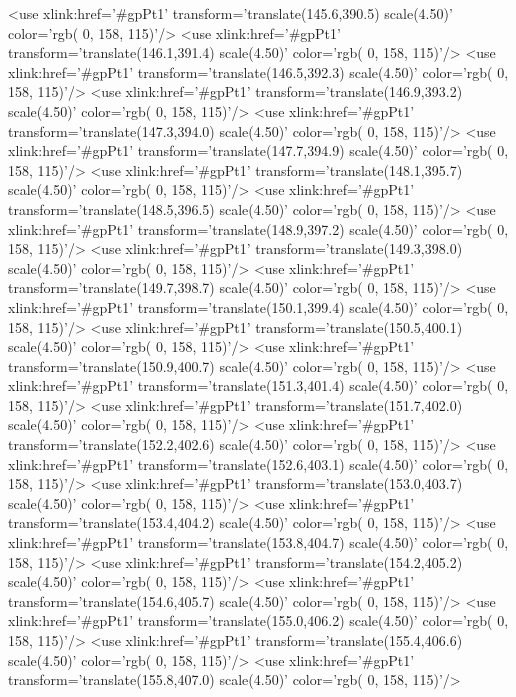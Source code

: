 	<use xlink:href='#gpPt1' transform='translate(145.6,390.5) scale(4.50)' color='rgb(  0, 158, 115)'/>
	<use xlink:href='#gpPt1' transform='translate(146.1,391.4) scale(4.50)' color='rgb(  0, 158, 115)'/>
	<use xlink:href='#gpPt1' transform='translate(146.5,392.3) scale(4.50)' color='rgb(  0, 158, 115)'/>
	<use xlink:href='#gpPt1' transform='translate(146.9,393.2) scale(4.50)' color='rgb(  0, 158, 115)'/>
	<use xlink:href='#gpPt1' transform='translate(147.3,394.0) scale(4.50)' color='rgb(  0, 158, 115)'/>
	<use xlink:href='#gpPt1' transform='translate(147.7,394.9) scale(4.50)' color='rgb(  0, 158, 115)'/>
	<use xlink:href='#gpPt1' transform='translate(148.1,395.7) scale(4.50)' color='rgb(  0, 158, 115)'/>
	<use xlink:href='#gpPt1' transform='translate(148.5,396.5) scale(4.50)' color='rgb(  0, 158, 115)'/>
	<use xlink:href='#gpPt1' transform='translate(148.9,397.2) scale(4.50)' color='rgb(  0, 158, 115)'/>
	<use xlink:href='#gpPt1' transform='translate(149.3,398.0) scale(4.50)' color='rgb(  0, 158, 115)'/>
	<use xlink:href='#gpPt1' transform='translate(149.7,398.7) scale(4.50)' color='rgb(  0, 158, 115)'/>
	<use xlink:href='#gpPt1' transform='translate(150.1,399.4) scale(4.50)' color='rgb(  0, 158, 115)'/>
	<use xlink:href='#gpPt1' transform='translate(150.5,400.1) scale(4.50)' color='rgb(  0, 158, 115)'/>
	<use xlink:href='#gpPt1' transform='translate(150.9,400.7) scale(4.50)' color='rgb(  0, 158, 115)'/>
	<use xlink:href='#gpPt1' transform='translate(151.3,401.4) scale(4.50)' color='rgb(  0, 158, 115)'/>
	<use xlink:href='#gpPt1' transform='translate(151.7,402.0) scale(4.50)' color='rgb(  0, 158, 115)'/>
	<use xlink:href='#gpPt1' transform='translate(152.2,402.6) scale(4.50)' color='rgb(  0, 158, 115)'/>
	<use xlink:href='#gpPt1' transform='translate(152.6,403.1) scale(4.50)' color='rgb(  0, 158, 115)'/>
	<use xlink:href='#gpPt1' transform='translate(153.0,403.7) scale(4.50)' color='rgb(  0, 158, 115)'/>
	<use xlink:href='#gpPt1' transform='translate(153.4,404.2) scale(4.50)' color='rgb(  0, 158, 115)'/>
	<use xlink:href='#gpPt1' transform='translate(153.8,404.7) scale(4.50)' color='rgb(  0, 158, 115)'/>
	<use xlink:href='#gpPt1' transform='translate(154.2,405.2) scale(4.50)' color='rgb(  0, 158, 115)'/>
	<use xlink:href='#gpPt1' transform='translate(154.6,405.7) scale(4.50)' color='rgb(  0, 158, 115)'/>
	<use xlink:href='#gpPt1' transform='translate(155.0,406.2) scale(4.50)' color='rgb(  0, 158, 115)'/>
	<use xlink:href='#gpPt1' transform='translate(155.4,406.6) scale(4.50)' color='rgb(  0, 158, 115)'/>
	<use xlink:href='#gpPt1' transform='translate(155.8,407.0) scale(4.50)' color='rgb(  0, 158, 115)'/>
